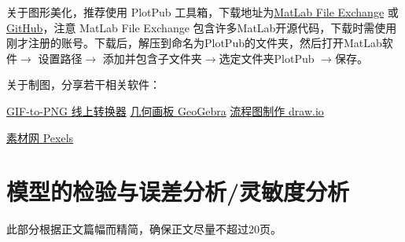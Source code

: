 \documentclass[12pt,utf8]{article}
\begin{document}
%
%        
%




关于图形美化，推荐使用 PlotPub 工具箱，下载地址为\href{https://www.mathworks.com/matlabcentral/fileexchange/47921-plotpub-publication-quality-graphs-in-matlab}{MatLab File Exchange} 或 \href{https://github.com/masumhabib/PlotPub}{GitHub}，注意 MatLab File Exchange 包含许多MatLab开源代码，下载时需使用刚才注册的账号。下载后，解压到命名为PlotPub的文件夹，然后打开MatLab软件$ \rightarrow $ 设置路径$ \rightarrow $ 添加并包含子文件夹$ \rightarrow $选定文件夹PlotPub $\rightarrow $保存。



关于制图，分享若干相关软件：

\href{https://www.cleverpdf.com/cn/gif-to-png}{GIF-to-PNG 线上转换器}
\qquad 
\href{https://www.geogebra.org/geometry}{几何画板 GeoGebra}
\qquad
\href{https://github.com/jgraph/drawio-desktop/releases}{流程图制作 draw.io}

\href{https://www.pexels.com/zh-cn/}{素材网 Pexels}
\qquad



\section{模型的检验与误差分析/灵敏度分析}

此部分根据正文篇幅而精简，确保正文尽量不超过20页。
\end{document}
